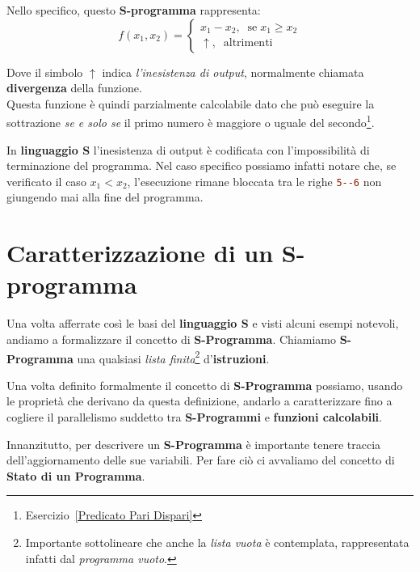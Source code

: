 Nello specifico, questo \textbf{S-programma} rappresenta:
\begin{equation}
  f(x_1, x_2)=\begin{cases}
    x_1-x_2, \;\; \text{se}\; x_1\geqslant x_2\\
    \uparrow, \;\;\text{altrimenti}
  \end{cases}
  \label{Funzione Sottrazione Eq}
\end{equation}

Dove il simbolo \(\uparrow\) indica \textit{l'inesistenza di output}, normalmente chiamata \textbf{divergenza} della funzione.\\
Questa funzione è quindi parzialmente calcolabile dato che può eseguire la sottrazione \textit{se e solo se} il primo numero è maggiore o uguale del secondo\footnote{Esercizio~\ref{Predicato Pari Dispari}}.

In \textbf{linguaggio S} l'inesistenza di output è codificata con l'impossibilità di terminazione del programma. Nel caso specifico possiamo infatti notare che, se verificato il caso \(x_1 < x_2\), l'esecuzione rimane bloccata tra le righe \lstinline[language=ini]{5--6} non giungendo mai alla fine del programma.


\section{Caratterizzazione di un S-programma}

Una volta afferrate così le basi del \textbf{linguaggio S} e visti alcuni esempi notevoli, andiamo a formalizzare il concetto di \textbf{S-Programma}.
Chiamiamo \textbf{S-Programma} una qualsiasi \textit{lista finita}\footnote{Importante sottolineare che anche la \textit{lista vuota} è contemplata,
rappresentata infatti dal \textit{programma vuoto}.} d'\textbf{istruzioni}.


Una volta definito formalmente il concetto di \textbf{S-Programma} possiamo, usando le proprietà che derivano da questa definizione,
andarlo a caratterizzare fino a cogliere il parallelismo suddetto tra \textbf{S-Programmi} e \textbf{funzioni calcolabili}.

Innanzitutto, per descrivere un \textbf{S-Programma} è importante tenere traccia dell'aggiornamento delle sue variabili. Per fare ciò ci avvaliamo del concetto di
\textbf{Stato di un Programma}.


